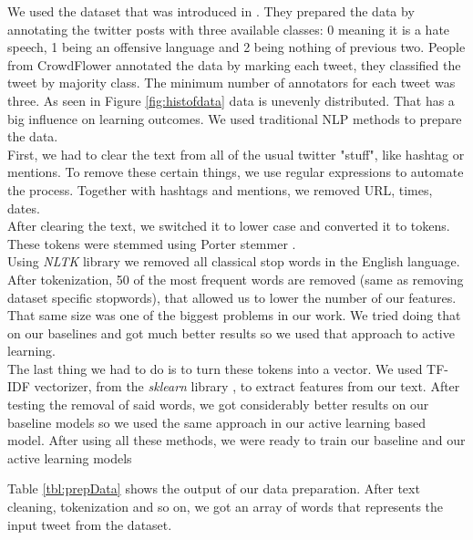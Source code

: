 \documentclass[10pt, a4paper]{article}
\begin{document}
	We used the dataset that was introduced in \citet{Davidson2017AutomatedHS}. They prepared the data by annotating the twitter posts with three available classes: 0 meaning it is a hate speech, 1 being an offensive language and 2 being nothing of previous two. People from CrowdFlower annotated the data by marking each tweet, they classified the tweet by majority class. The minimum number of annotators for each tweet was three.
	As seen in Figure \ref{fig:histofdata} data is unevenly distributed. That has a big influence on learning outcomes. We used traditional NLP methods to prepare the data.
	\\First, we had to clear the text from all of the usual twitter "stuff", like hashtag or mentions. To remove these certain things, we use regular expressions to automate the process. Together with hashtags and mentions, we removed URL, times, dates.
	\\After clearing the text, we switched it to lower case and converted it to tokens. These tokens were stemmed using Porter stemmer \citep{PorterStemmer}.
	\\Using \textit{NLTK} library \citep{NLTK} we removed all classical stop words in the English language. After tokenization, 50 of the most frequent words are removed (same as removing dataset specific stopwords), that allowed us to lower the number of our features. That same size was one of the biggest problems in our work.
	We tried doing that on our baselines and got much better results so we used that approach to active learning.
	\\The last thing we had to do is to turn these tokens into a vector. We used TF-IDF vectorizer, from the \textit{sklearn} library \citep{scikit-learn}, to extract features from our text. After testing the removal of said words, we got considerably better results on our baseline models so we used the same approach in our active learning based model.
	After using all these methods, we were ready to train our baseline and our active learning models
	
	Table \ref{tbl:prepData} shows the output of our data preparation. After text cleaning, tokenization and so on, we got an array of words that represents the input tweet from the dataset.
	
\end{document}
